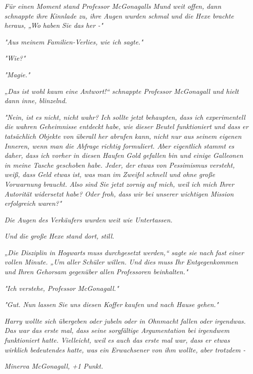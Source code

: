 {\emph{Für einen Moment stand Professor McGonagalls Mund weit offen, dann schnappte ihre Kinnlade zu, ihre Augen wurden schmal und die Hexe brachte heraus, „\emph{Wo}} \emph{haben Sie das her -"}

\emph{"Aus meinem Familien-Verlies, wie ich sagte."}

\emph{"\emph{Wie?}"}

\emph{"Magie."}

\emph{„Das ist wohl kaum eine Antwort!“ schnappte Professor McGonagall und hielt dann inne, blinzelnd.}

\emph{"Nein, ist es nicht, nicht wahr? Ich} \emph{\emph{sollte}} \emph{jetzt behaupten, dass ich experimentell die wahren Geheimnisse entdeckt habe, wie dieser Beutel funktioniert und dass er tatsächlich Objekte von überall her abrufen kann,} \emph{nicht nur aus seinem eigenen Inneren, wenn man die Abfrage richtig formuliert. Aber eigentlich stammt es daher, dass ich vorher in diesen Haufen Gold gefallen bin und einige Galleonen in meine Tasche geschoben habe. Jeder, der etwas von Pessimismus versteht, weiß, dass Geld etwas ist, was man im Zweifel schnell und ohne große Vorwarnung braucht. Also sind Sie jetzt zornig auf mich, weil ich mich Ihrer Autorität widersetzt habe? Oder froh, dass wir bei unserer wichtigen Mission erfolgreich waren?"}

\emph{Die Augen des Verkäufers wurden weit wie Untertassen.}

\emph{Und die große Hexe stand dort, still.}

\emph{„Die Disziplin in Hogwarts} \emph{\emph{muss}} \emph{durchgesetzt werden,“ sagte sie nach fast einer vollen Minute. „Um} \emph{\emph{aller}} \emph{Schüler willen. Und dies} \emph{\emph{muss}} \emph{Ihr Entgegenkommen und Ihren Gehorsam gegenüber} \emph{\emph{allen}} \emph{Professoren beinhalten."}

\emph{"Ich verstehe, Professor McGonagall."}

\emph{"Gut. Nun lassen Sie uns diesen Koffer kaufen und nach Hause gehen."}

\emph{Harry wollte sich übergeben oder jubeln oder in Ohnmacht fallen oder} \emph{\emph{irgendwas.}} \emph{Das war das erste mal, dass seine sorgfältige Argumentation bei} \emph{\emph{irgendwem}} \emph{funktioniert hatte. Vielleicht, weil es auch das erste mal war, dass er etwas wirklich bedeutendes hatte, was ein Erwachsener von ihm wollte, aber trotzdem -}

\emph{Minerva McGonagall, +1 Punkt.}

}

